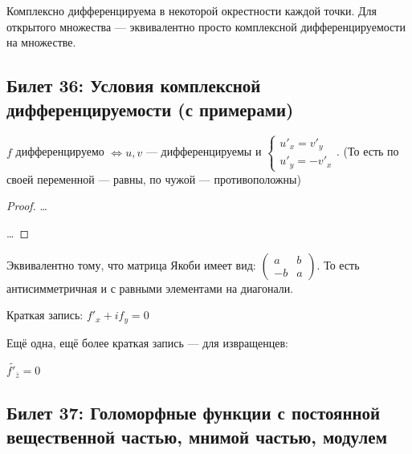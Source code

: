 \documentclass[12pt, a4paper, oneside]{memoir}
\begin{document}
\begin{definition}
     Комплексно дифференцируема в некоторой окрестности каждой точки. 
    Для открытого множества — эквивалентно просто комплексной дифференцируемости на множестве.
\end{definition}

\subsection{Билет 36: Условия комплексной дифференцируемости (с примерами)}

\begin{theorem}
    $f$ дифференцируемо $\Leftrightarrow u, v$ — дифференцируемы и $\begin{cases}
        u'_x = v'_y \\ u'_y = -v'_x
    \end{cases}$. (То есть по своей переменной — равны, по чужой — противоположны)

    \begin{proof}
        \rightimp …

        \leftimp …
    \end{proof}
\end{theorem}

\begin{remark}
    Эквивалентно тому, что матрица Якоби имеет вид: $\begin{pmatrix}
        a & b \\
        -b & a
    \end{pmatrix}$. То есть антисимметричная и с равными элементами на диагонали.
\end{remark}

\begin{remark}
    Краткая запись: $f'_x + i f_y = 0$
\end{remark}

\begin{remark}
    Ещё одна, ещё более краткая запись — для извращенцев:
    
    $\tilde{f'_{\overline{z}}} = 0$
\end{remark}

\subsection{Билет 37: Голоморфные функции с постоянной вещественной частью, мнимой частью, модулем}
\end{document}
